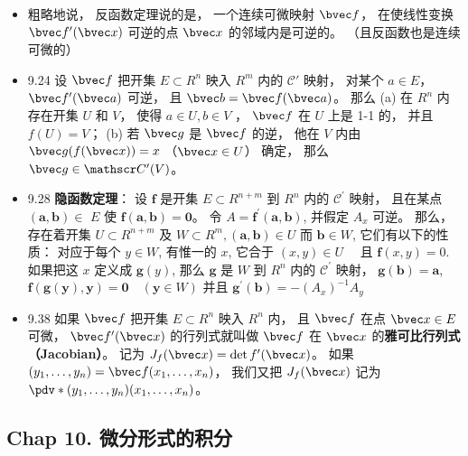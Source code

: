 \begin{itemize}
\item 粗略地说， 反函数定理说的是， 一个连续可微映射 $\bvec f$， 在使线性变换 $\bvec f'(\bvec x)$ 可逆的点 $\bvec x$ 的邻域内是可逆的。 （且反函数也是连续可微的）

\item 9.24 设 $\bvec f$ 把开集 $E\subset R^n$ 映入 $R^m$ 内的 $\mathscr C'$ 映射， 对某个 $a\in E$， $\bvec f'(\bvec a)$ 可逆， 且 $\bvec b = \bvec f(\bvec a)$。 那么 (a) 在 $R^n$ 内存在开集 $U$ 和 $V$， 使得 $a\in U, b\in V$ ， $\bvec f$ 在 $U$ 上是 1-1 的， 并且 $f(U) = V$； (b) 若 $\bvec g$ 是 $\bvec f$ 的逆， 他在 $V$ 内由 $\bvec g(f(\bvec x)) = x$ （$\bvec x\in U$） 确定， 那么 $\bvec g\in \mathscr C'(V)$。

\item 9.28 \textbf{隐函数定理}： 设 $\mathbf{f}$ 是开集 $E \subset R^{n+m}$ 到 $R^{n}$ 内的 $\mathscr{C}^{\prime}$ 映射， 且在某点 $(\boldsymbol a, \boldsymbol b) \in$ $E$ 使 $\mathbf{f}(\boldsymbol{a}, \boldsymbol{b})=\mathbf{0}$。 令 $A=\mathbf{f}^{\prime}(\boldsymbol{a}, \boldsymbol{b})$, 并假定 $A_{x}$ 可逆。
那么， 存在着开集 $U \subset R^{n+m}$ 及 $W \subset R^{m},(\boldsymbol{a}, \boldsymbol{b}) \in U$ 而 $\boldsymbol{b} \in W$, 它们有以下的性质： 对应于每个 $y \in W$, 有惟一的 $x$, 它合于 $(x, y) \in U \quad$ 且 $\mathbf{f}(x, y)=0$. 如果把这 $x$ 定义成 $\mathbf{g}(y)$, 那么 $\mathbf{g}$ 是 $W$ 到 $R^{n}$ 内的 $\mathscr{C}^{\prime}$ 映射， $\mathbf{g}(\boldsymbol{b})=\boldsymbol{a}$, $\mathbf{f}(\mathbf{g}(\boldsymbol{y}), \boldsymbol{y})=\mathbf{0} \quad(\boldsymbol{y} \in W)$ 并且 $\mathbf{g}^{\prime}(\boldsymbol{b})=-\left(A_{x}\right)^{-1} A_{y}$

\item 9.38 如果 $\bvec f$ 把开集 $E\subset R^n$ 映入 $R^n$ 内， 且 $\bvec f$ 在点 $\bvec x\in E$ 可微， $\bvec f'(\bvec x)$ 的行列式就叫做 $\bvec f$ 在 $\bvec x$ 的\textbf{雅可比行列式（Jacobian）}。 记为 $J_f(\bvec x) = \det f'(\bvec x)$。 如果 $(y_1,\dots,y_n)=\bvec f(x_1,\dots, x_n)$， 我们又把 $J_f(\bvec x)$ 记为 $\pdv*{(y_1,\dots,y_n)}{(x_1,\dots, x_n)}$。
\end{itemize}

\subsection{Chap 10. 微分形式的积分}

